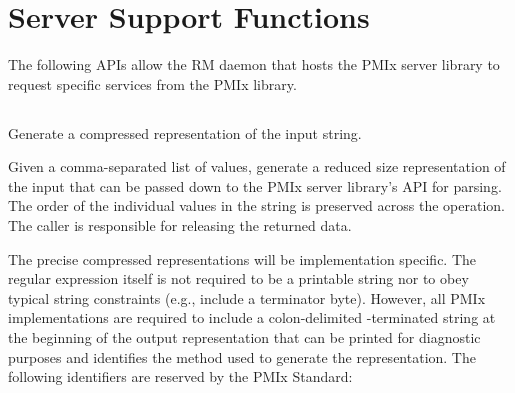 \section{Server Support Functions}

The following \acp{API} allow the \ac{RM} daemon that hosts the \ac{PMIx} server library to request specific services from the \ac{PMIx} library.

\subsection{}

\summary

Generate a compressed representation of the input string.

\format


\begin{arglist}
\end{arglist}

\returnsimple

\descr

Given a comma-separated list of  values, generate a reduced size representation of the input that can be passed down to the \ac{PMIx} server library's  \ac{API} for parsing. The order of the individual values in the  string is preserved across the operation. The caller is responsible for releasing the returned data.

\label{regex:fmt}The precise compressed representations will be implementation specific. The regular expression itself is not required to be a printable string nor to obey typical string constraints (e.g., include a  terminator byte). However, all \ac{PMIx} implementations are required to include a colon-delimited -terminated string at the beginning of the output representation that can be printed for diagnostic purposes and identifies the method used to generate the representation. The following identifiers are reserved by the \ac{PMIx} Standard:

